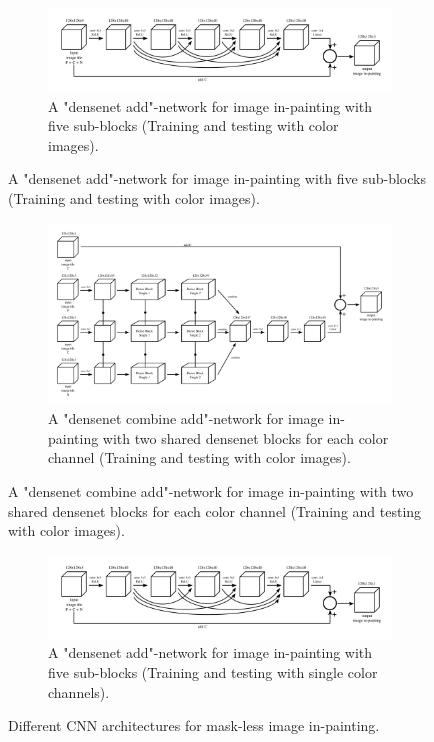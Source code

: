 \begin{figure}[H]
\centering
	\begin{subfigure}{.95\textwidth}
	\includegraphics[width=\linewidth]{models_painting_warp/inpai6.png}
	\caption[figure]{A "densenet add"-network for image in-painting with five sub-blocks (Training and testing with color images).}
	\label{fig:inpai6}
	\end{subfigure}
\end{figure}
\begin{figure}[H]
  \ContinuedFloat
  \centering
  \begin{subfigure}{.95\textwidth}
	\includegraphics[width=\linewidth]{models_painting_warp/inpai7.png}
	\caption[figure]{A "densenet combine add"-network for image in-painting with two shared densenet blocks for each color channel (Training and testing with color images).}
	\label{fig:inpai7}
	\end{subfigure}

\end{figure}
\begin{figure}[H]
  \ContinuedFloat
\centering
	\begin{subfigure}{.95\textwidth}
	\includegraphics[width=\linewidth]{models_painting_warp/inpai5.png}
	\caption[figure]{A "densenet add"-network for image in-painting with five sub-blocks (Training and testing with  single color channels).}
	\label{fig:inpai5}
	\end{subfigure}
	
	  	
	\caption[figure]{Different CNN architectures for mask-less image in-painting.}
		\label{fig:paint_architectures2}
\end{figure}



